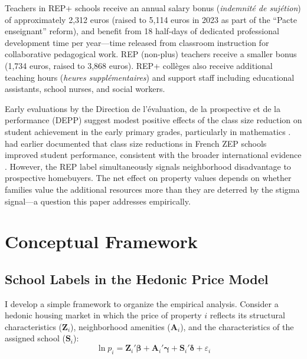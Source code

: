 \documentclass[12pt]{article}
\begin{document}
Teachers in REP+ schools receive an annual salary bonus (\textit{indemnit\'{e} de suj\'{e}tion}) of approximately 2,312 euros (raised to 5,114 euros in 2023 as part of the ``Pacte enseignant'' reform), and benefit from 18 half-days of dedicated professional development time per year---time released from classroom instruction for collaborative pedagogical work. REP (non-plus) teachers receive a smaller bonus (1,734 euros, raised to 3,868 euros). REP+ coll\`{e}ges also receive additional teaching hours (\textit{heures suppl\'{e}mentaires}) and support staff including educational assistants, school nurses, and social workers.

Early evaluations by the Direction de l'\'{e}valuation, de la prospective et de la performance (DEPP) suggest modest positive effects of the class size reduction on student achievement in the early primary grades, particularly in mathematics \citep{depp2019}. \citet{piketty2006} had earlier documented that class size reductions in French ZEP schools improved student performance, consistent with the broader international evidence \citep{angrist1999, krueger1999, fredriksson2013}. However, the REP label simultaneously signals neighborhood disadvantage to prospective homebuyers. The net effect on property values depends on whether families value the additional resources more than they are deterred by the stigma signal---a question this paper addresses empirically.


\section{Conceptual Framework}\label{sec:framework}

\subsection{School Labels in the Hedonic Price Model}

I develop a simple framework to organize the empirical analysis. Consider a hedonic housing market \citep{rosen1974} in which the price of property $i$ reflects its structural characteristics ($\mathbf{Z}_i$), neighborhood amenities ($\mathbf{A}_i$), and the characteristics of the assigned school ($\mathbf{S}_i$):
\begin{equation}\label{eq:hedonic}
\ln p_i = \mathbf{Z}_i'\boldsymbol{\beta} + \mathbf{A}_i'\boldsymbol{\gamma} + \mathbf{S}_i'\boldsymbol{\delta} + \varepsilon_i
\end{equation}
\end{document}
